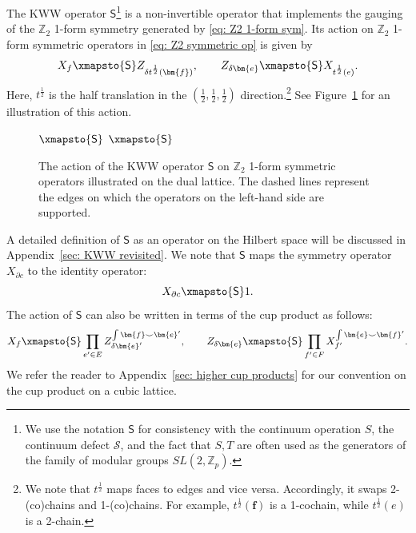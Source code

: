 \documentclass[aps,twocolumn,prx,floatfix,preprintnumbers, nofootinbib,10pt]{revtex4-2}
\numberwithin{equation}{section}
\theoremstyle{definition}
\theoremstyle{remark}
\theoremstyle{claim}
\newcommand{\Z}{{\mathbb Z}}
\newcommand{\mc}[1]{\mathcal{#1}}
\renewcommand{\sf}[1]{\mathsf{#1}}
\begin{document}
The KWW operator $\mathsf{S}$\footnote{We use the notation $\sf{S}$ for consistency with the continuum operation $S$, the continuum defect $\mc{S}$, and the fact that $S, T$ are often used as the generators of the family of modular groups $SL(2, \Z_p)$.} is a non-invertible operator that implements the gauging of the $\mathbb{Z}_2$ 1-form symmetry generated by \eqref{eq: Z2 1-form sym}.
Its action on $\mathbb{Z}_2$ 1-form symmetric operators in \eqref{eq: Z2 symmetric op} is given by \cite{Gorantla:2024ocs}
\begin{equation}
X_f \xmapsto{\mathsf{S}} Z_{\delta t^{\frac{1}{2}}(\bm{f})}, \qquad
Z_{\delta \bm{e}} \xmapsto{\mathsf{S}} X_{t^{\frac{1}{2}}(e)}.
\label{eq: Z2 KWW}
\end{equation}
Here, $t^{\frac{1}{2}}$ is the half translation in the $(\frac{1}{2}, \frac{1}{2}, \frac{1}{2})$ direction.\footnote{We note that $t^{\frac{1}{2}}$ maps faces to edges and vice versa.
Accordingly, it swaps 2-(co)chains and 1-(co)chains. For example, $t^{\frac{1}{2}}(\bm{f})$ is a 1-cochain, while $t^{\frac{1}{2}}(e)$ is a 2-chain.}
See Figure~\ref{fig: Z2 KWW} for an illustration of this action.
\begin{figure}[t]
\centering
{}
$\xmapsto{\mathsf{S}}$
$\xmapsto{\mathsf{S}}$
\caption{The action of the KWW operator $\mathsf{S}$ on $\mathbb{Z}_2$ 1-form symmetric operators illustrated on the dual lattice. The dashed lines represent the edges on which the operators on the left-hand side are supported.}
\label{fig: Z2 KWW}
\end{figure}
A detailed definition of $\mathsf{S}$ as an operator on the Hilbert space will be discussed in Appendix~\ref{sec: KWW revisited}.
We note that $\sf{S}$ maps the symmetry operator $X_{\partial c}$ to the identity operator:
\begin{equation}
X_{\partial c} \xmapsto{\sf{S}} 1.
\end{equation}
The action of $\sf{S}$ can also be written in terms of the cup product as follows:
\begin{equation}
X_f \xmapsto{\sf{S}} \prod_{e^{\prime} \in E} Z_{\delta \bm{e}^{\prime}}^{\int \bm{f} \smile \bm{e}^{\prime}}, \qquad
Z_{\delta \bm{e}} \xmapsto{\sf{S}} \prod_{f^{\prime} \in F} X_{f^{\prime}}^{\int \bm{e} \smile \bm{f}^{\prime}}.
\label{eq: Z2 KWW cup}
\end{equation}
We refer the reader to Appendix~\ref{sec: higher cup products} for our convention on the cup product on a cubic lattice.
\end{document}
